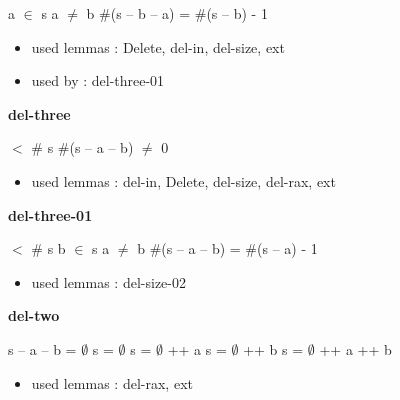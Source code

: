 \documentclass[a4paper]{article}
\begin{document}
\medskip

 \Fol a $\in$ s \And a $\neq$ b \Imp \#(s -- b -- a) = \#(s -- b) - 1

\begin{itemize}


\item       used lemmas  : Delete, del-in, del-size, ext
\item       used by      : del-three-01

\end{itemize}

\medskip

\bigskip

{\large\bf del-three}

\medskip

  $<$ \# s \Imp \#(s -- a -- b) $\neq$ 0

\begin{itemize}


\item       used lemmas  : del-in, Delete, del-size, del-rax, ext

\end{itemize}

\medskip

\bigskip

{\large\bf del-three-01}

\medskip

  $<$ \# s \And b $\in$ s \And a $\neq$ b \Imp \#(s -- a -- b) = \#(s -- a) - 1

\begin{itemize}


\item       used lemmas  : del-size-02

\end{itemize}

\medskip

\bigskip

{\large\bf del-two}

\medskip

s -- a -- b = $\emptyset$ \Fol s = $\emptyset$ \Or s = $\emptyset$ ++ a \Or s = $\emptyset$ ++ b \Or s = $\emptyset$ ++ a ++ b

\begin{itemize}


\item       used lemmas  : del-rax, ext

\end{itemize}

\medskip
\end{document}
